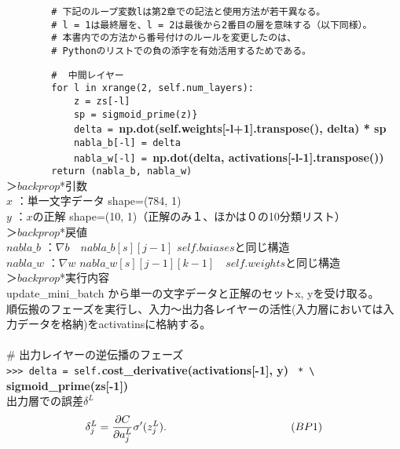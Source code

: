 \documentclass[11pt,a4j,fleqn]{jarticle}
\begin{document}
\begin{verbatim}
        # 下記のループ変数lは第2章での記法と使用方法が若干異なる。
        # l = 1は最終層を、l = 2は最後から2番目の層を意味する（以下同様）。
        # 本書内での方法から番号付けのルールを変更したのは、
        # Pythonのリストでの負の添字を有効活用するためである。
\end{verbatim}
\verb|        #  中間レイヤー|\\
\verb|        for l in xrange(2, self.num_layers):|\\
\verb|            z = zs[-l]|\\
\verb|            sp = sigmoid_prime(z)}|\\
\verb|            delta = |{\Large \bf np.dot(self.weights[-l+1].transpose(), delta) * sp}\\
\verb|            nabla_b[-l] = delta|\\
\verb|            nabla_w[-l] = |{\Large \bf np.dot(delta, activations[-l-1].transpose())}\\
\verb|        return (nabla_b, nabla_w)|\\
＞$backprop$*引数 \\
\hspace{5mm}$x$ ：単一文字データ shape=(784, 1)\\
\hspace{5mm}$y$ ：$x$の正解 shape=(10, 1)（正解のみ１、ほかは０の10分類リスト）\\
＞$backprop$*戻値 \\
\hspace{5mm}$nabla\_b$ ：$\nabla b$　$nabla\_b[s][j-1]$ $self.baiases$と同じ構造\\
\hspace{5mm}$nabla\_w$ ：$\nabla w$  $nabla\_w[s][j-1][k-1]$　$self.weights$と同じ構造\\
＞$backprop$*実行内容 \\
update\_mini\_batch から単一の文字データと正解のセットx, yを受け取る。\\
順伝搬のフェーズを実行し、入力〜出力各レイヤーの活性(入力層においては入力データを格納)をactivatinsに格納する。\\
\\
\# 出力レイヤーの逆伝播のフェーズ\\
\verb|>>> delta = self.|{\Large \bf cost\_derivative(activations[-1], y)} \verb| * \|\\
{\Large \bf sigmoid\_prime(zs[-1])}\\
出力層での誤差$\delta^L$
\begin{eqnarray}
  \delta^L_j = \frac{\partial C}{\partial a^L_j} \sigma'(z^L_j).  \hspace{4.0cm}(BP1) \nonumber
\end{eqnarray}
\end{document}
